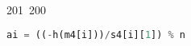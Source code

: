 201~200~\documentclass{article}
\begin{document}
\begin{lstlisting}[language=Python, caption=LLL Algorithm to crack private key chall 4]
	                                                                        	                                                                    	                                	                    	                    	                        	                        	                    	                                                                	                	                                                                    	                    							                                                                                                                                                                                                    		                                                                                                                        				    			                                                                                                                                                        ai = ((-h(m4[i]))/s4[i][1]) % n
	                                                                        	                                                                    	                                	                    	                    	                        	                        	                    	                                                                	                	                                                                    	                    							                                                                                                                                                                                                    		                                                                                                                        				    			                                                                                                                                                                ti = (s4[i][0]/s4[i][1]) % n
	                                                                        	                                                                    	                                	                    	                    	                        	                        	                    	                                                                	                	                                                                    	                    							                                                                                                                                                                                                    		                                                                                                                        				    			                                                                                                                                                                        A[-1, i] = ai

\end{lstlisting}
\end{document}
